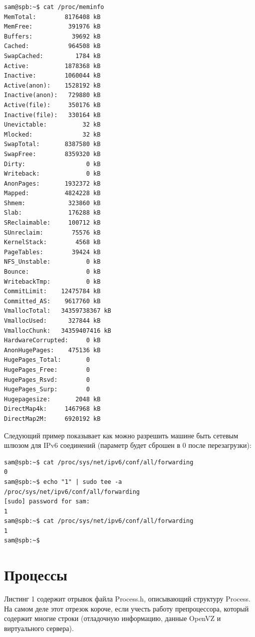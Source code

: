 \documentclass[a4paper, 12pt]{article}		%
\begin{document}
\begin{verbatim}
sam@spb:~$ cat /proc/meminfo 
MemTotal:        8176408 kB
MemFree:          391976 kB
Buffers:           39692 kB
Cached:           964508 kB
SwapCached:         1784 kB
Active:          1878368 kB
Inactive:        1060044 kB
Active(anon):    1528192 kB
Inactive(anon):   729880 kB
Active(file):     350176 kB
Inactive(file):   330164 kB
Unevictable:          32 kB
Mlocked:              32 kB
SwapTotal:       8387580 kB
SwapFree:        8359320 kB
Dirty:                 0 kB
Writeback:             0 kB
AnonPages:       1932372 kB
Mapped:          4824228 kB
Shmem:            323860 kB
Slab:             176288 kB
SReclaimable:     100712 kB
SUnreclaim:        75576 kB
KernelStack:        4568 kB
PageTables:        39424 kB
NFS_Unstable:          0 kB
Bounce:                0 kB
WritebackTmp:          0 kB
CommitLimit:    12475784 kB
Committed_AS:    9617760 kB
VmallocTotal:   34359738367 kB
VmallocUsed:      327844 kB
VmallocChunk:   34359407416 kB
HardwareCorrupted:     0 kB
AnonHugePages:    475136 kB
HugePages_Total:       0
HugePages_Free:        0
HugePages_Rsvd:        0
HugePages_Surp:        0
Hugepagesize:       2048 kB
DirectMap4k:     1467968 kB
DirectMap2M:     6920192 kB
\end{verbatim}

Следующий пример показывает как можно разрешить машине быть сетевым шлюзом для IPv6 соединений (параметр будет сброшен в 0 после перезагрузки):

\begin{verbatim}
sam@spb:~$ cat /proc/sys/net/ipv6/conf/all/forwarding
0
sam@spb:~$ echo "1" | sudo tee -a /proc/sys/net/ipv6/conf/all/forwarding
[sudo] password for sam: 
1
sam@spb:~$ cat /proc/sys/net/ipv6/conf/all/forwarding
1
sam@spb:~$
\end{verbatim}


\newpage
\section{Процессы}

Листинг 1 содержит отрывок файла Process.h, описывающий структуру Process. На самом деле этот отрезок короче, если учесть работу препроцессора, который содержит многие строки (отладочную информацию, данные OpenVZ и виртуального сервера).


\end{document}
